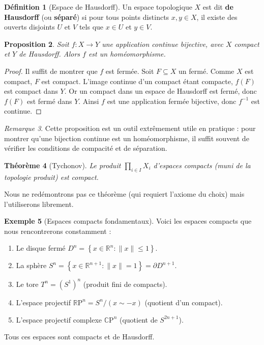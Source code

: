 \documentclass[12pt,a4paper,openany]{book}
\theoremstyle{definition}
\newtheorem{definition}{Définition}[chapter]
\newtheorem{exemple}[definition]{Exemple}
\theoremstyle{plain}
\newtheorem{theoreme}[definition]{Théorème}
\newtheorem{proposition}[definition]{Proposition}
\theoremstyle{remark}
\newtheorem{remarque}[definition]{Remarque}
\newcommand{\R}{\mathbb{R}}
\newcommand{\RP}{\mathbb{R}\mathrm{P}}
\newcommand{\CP}{\mathbb{C}\mathrm{P}}
\newcommand{\set}[1]{\left\{#1\right\}}
\begin{document}
\begin{definition}[Espace de Hausdorff]\label{def:hausdorff}
Un espace topologique $X$ est dit \textbf{de Hausdorff} (ou \textbf{séparé}) si
pour tous points distincts $x, y \in X$, il existe des ouverts disjoints $U$ et
$V$ tels que $x \in U$ et $y \in V$.
\end{definition}

\begin{proposition}\label{prop:compact-hausdorff}
Soit $f : X \to Y$ une application continue bijective, avec $X$ compact et $Y$
de Hausdorff. Alors $f$ est un homéomorphisme.
\end{proposition}

\begin{proof}
Il suffit de montrer que $f$ est fermée. Soit $F \subseteq X$ un fermé. Comme
$X$ est compact, $F$ est compact. L'image continue d'un compact étant compacte,
$f(F)$ est compact dans $Y$. Or un compact dans un espace de Hausdorff est
fermé, donc $f(F)$ est fermé dans $Y$. Ainsi $f$ est une application fermée
bijective, donc $f^{-1}$ est continue.
\end{proof}

\begin{remarque}\label{rem:compact-hausdorff-pratique}
Cette proposition est un outil extrêmement utile en pratique : pour montrer
qu'une bijection continue est un homéomorphisme, il suffit souvent de vérifier
les conditions de compacité et de séparation.
\end{remarque}

\begin{theoreme}[Tychonov]\label{thm:tychonov}
Le produit $\prod_{i \in I} X_i$ d'espaces compacts (muni de la topologie
produit) est compact.
\end{theoreme}

Nous ne redémontrons pas ce théorème (qui requiert l'axiome du choix) mais
l'utiliserons librement.

\begin{exemple}[Espaces compacts fondamentaux]\label{ex:compacts-fondamentaux}
Voici les espaces compacts que nous rencontrerons constamment :
\begin{enumerate}[label=(\alph*)]
\item Le disque fermé $D^n = \set{x \in \R^n : \|x\| \leqslant 1}$.
\item La sphère $S^n = \set{x \in \R^{n+1} : \|x\| = 1} = \partial D^{n+1}$.
\item Le tore $T^n = (S^1)^n$ (produit fini de compacts).
\item L'espace projectif $\RP^n = S^n/(x \sim -x)$ (quotient d'un compact).
\item L'espace projectif complexe $\CP^n$ (quotient de $S^{2n+1}$).
\end{enumerate}
Tous ces espaces sont compacts et de Hausdorff.
\end{exemple}
\end{document}
